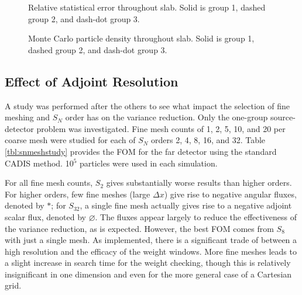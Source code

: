 \begin{figure}[!] 
   \centering
   \caption{Relative statistical error throughout slab. Solid is group 1, dashed
group 2, and dash-dot group 3.}
   \label{fig:3gstat}
\end{figure}

\begin{figure}[!] 
   \centering
   \caption{Monte Carlo particle density throughout slab.  Solid is group 1,
dashed group 2, and dash-dot group 3.}
   \label{fig:3gmcps}
\end{figure}

\subsection{Effect of Adjoint Resolution}

A study was performed after the others to see what impact the selection of fine
meshing and $S_N$ order has on the variance reduction.  Only the one-group
source-detector problem was investigated.  Fine mesh counts of 1, 2, 5, 10, and
20 per coarse mesh were studied for each of $S_N$ orders 2, 4, 8, 16, and 32. 
Table \ref{tbl:snmeshstudy} provides the FOM for the far detector using the
standard CADIS method.  10$^5$ particles were used in each simulation.

For all fine mesh counts, $S_2$ gives substantially worse results than higher
orders.  For higher orders, few fine meshes (\ie large $\Delta x$) give rise to
negative angular fluxes, denoted by $*$; for $S_{32}$, a single fine mesh
actually gives rise to a negative adjoint scalar flux, denoted by $\varnothing$.
 The fluxes appear largely to reduce the effectiveness of the variance
reduction, as is expected.  However, the best FOM comes from $S_8$ with just a
single mesh.  As implemented, there is a significant trade of between a high
resolution and the efficacy of the weight windows.  More fine meshes leads to a
slight increase in search time for the weight checking, though this is
relatively insignificant in one dimension and even for the more general case of
a Cartesian grid.  

